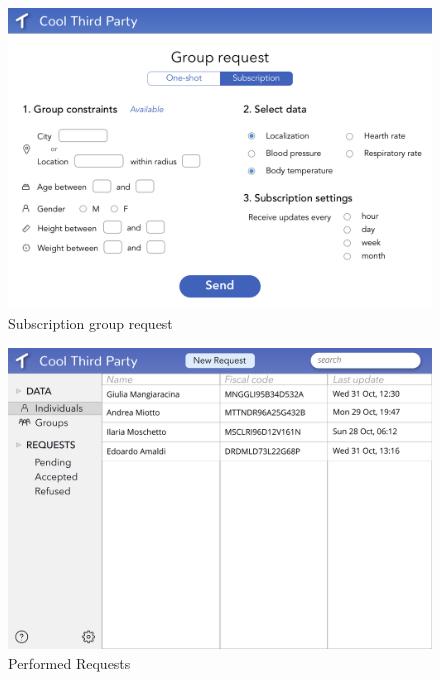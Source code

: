 \begin{figure}[H]
    \centering
    \includegraphics[scale=0.25]{Pictures/Mockup/web/group2.png}
    \caption{Subscription group request}
\end{figure}


\begin{figure}[H]
    \centering
    \includegraphics[scale=0.3]{rasdL/Pictures/Mockup/web/individuals-data.png}
    \caption{Performed Requests}
\end{figure}




